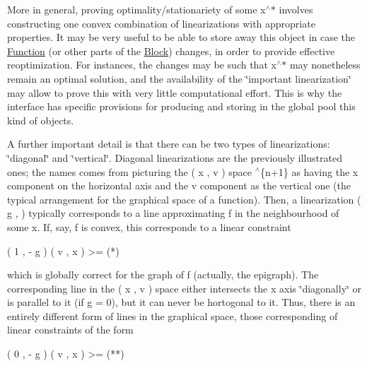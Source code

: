 More in general, proving optimality/stationariety of some x$^\wedge$$\ast$ involves constructing one convex combination of linearizations with appropriate properties. It may be very useful to be able to store away this object in case the \mbox{\hyperlink{class_s_m_spp__di__unipi__it_1_1_function}{Function}} (or other parts of the \mbox{\hyperlink{class_s_m_spp__di__unipi__it_1_1_block}{Block}}) changes, in order to provide effective reoptimization. For instances, the changes may be such that x$^\wedge$$\ast$ may nonetheless remain an optimal solution, and the availability of the \char`\"{}important linearization\char`\"{} may allow to prove this with very little computational effort. This is why the interface has specific provisions for producing and storing in the global pool this kind of objects.

A further important detail is that there can be two types of linearizations\+: \char`\"{}diagonal\char`\"{} and \char`\"{}vertical\char`\"{}. Diagonal linearizations are the previously illustrated ones; the names comes from picturing the ( x , v ) space $^\wedge$\{n+1\} as having the x component on the horizontal axis and the v component as the vertical one (the typical arrangement for the graphical space of a function). Then, a linearization ( g ,  ) typically corresponds to a line approximating f in the neighbourhood of some x. If, say, f is convex, this corresponds to a linear constraint \begin{DoxyVerb}  ( 1 , - g ) ( v , x ) >= \alpha       (*)
\end{DoxyVerb}


which is globally correct for the graph of f (actually, the epigraph). The corresponding line in the ( x , v ) space either intersects the x axis \char`\"{}diagonally\char`\"{} or is parallel to it (if g = 0), but it can never be hortogonal to it. Thus, there is an entirely different form of lines in the graphical space, those corresponding of linear constraints of the form \begin{DoxyVerb}  ( 0 , - g ) ( v , x ) >= \alpha       (**)
\end{DoxyVerb}


